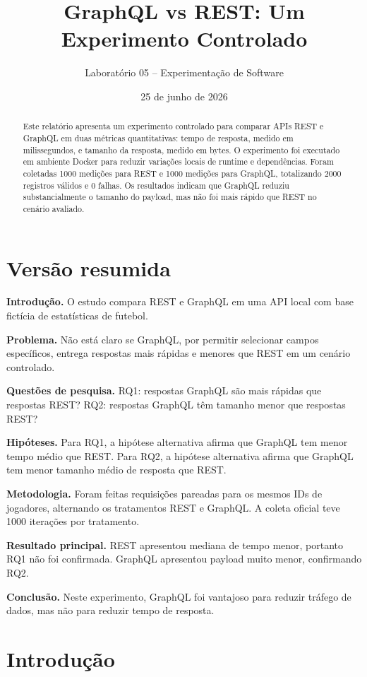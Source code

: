 \documentclass[12pt,a4paper]{article}
\title{GraphQL vs REST: Um Experimento Controlado}
\author{Laboratório 05 -- Experimentação de Software}
\date{25 de junho de 2026}
\begin{document}
\maketitle

\begin{abstract}
Este relatório apresenta um experimento controlado para comparar APIs REST e GraphQL em duas métricas quantitativas: tempo de resposta, medido em milissegundos, e tamanho da resposta, medido em bytes. O experimento foi executado em ambiente Docker para reduzir variações locais de runtime e dependências. Foram coletadas 1000 medições para REST e 1000 medições para GraphQL, totalizando 2000 registros válidos e 0 falhas. Os resultados indicam que GraphQL reduziu substancialmente o tamanho do payload, mas não foi mais rápido que REST no cenário avaliado.
\end{abstract}

\section{Versão resumida}

\textbf{Introdução.} O estudo compara REST e GraphQL em uma API local com base fictícia de estatísticas de futebol.

\textbf{Problema.} Não está claro se GraphQL, por permitir selecionar campos específicos, entrega respostas mais rápidas e menores que REST em um cenário controlado.

\textbf{Questões de pesquisa.} RQ1: respostas GraphQL são mais rápidas que respostas REST? RQ2: respostas GraphQL têm tamanho menor que respostas REST?

\textbf{Hipóteses.} Para RQ1, a hipótese alternativa afirma que GraphQL tem menor tempo médio que REST. Para RQ2, a hipótese alternativa afirma que GraphQL tem menor tamanho médio de resposta que REST.

\textbf{Metodologia.} Foram feitas requisições pareadas para os mesmos IDs de jogadores, alternando os tratamentos REST e GraphQL. A coleta oficial teve 1000 iterações por tratamento.

\textbf{Resultado principal.} REST apresentou mediana de tempo menor, portanto RQ1 não foi confirmada. GraphQL apresentou payload muito menor, confirmando RQ2.

\textbf{Conclusão.} Neste experimento, GraphQL foi vantajoso para reduzir tráfego de dados, mas não para reduzir tempo de resposta.

\section{Introdução}
\end{document}
